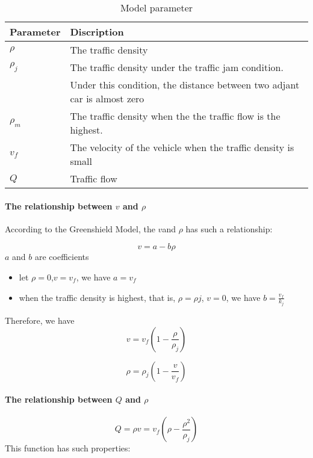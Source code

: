 \begin{table}
\centering
\begin{tabular}{ll}
\hline
Parameter & Discription\\
\hline
$\rho $ & The traffic density\\
$\rho_j$ & The traffic density under the traffic jam condition. \\
&Under this condition, the distance between two adjant car is almost zero\\
$\rho_m$ & The traffic density when the the traffic flow is the highest.\\
$v_f$ & The velocity of the vehicle when the traffic density is small \\
$Q$ & Traffic flow \\
\hline
\end{tabular}
\caption{Model parameter}
\end{table}


\paragraph{The relationship between $v$ and $\rho$ }
According to the Greenshield Model, the $v $and $\rho$ has such a 
relationship:

\begin{equation}
v = a - b\rho
\end{equation}
$a$ and $b$ are coefficients

\begin{itemize}
\item let $\rho = 0$,$v = v_f$,
we have $a = v_f$
\\
\item when the traffic density is highest, that is,
$\rho = \rho j$, $v = 0$,
we have $b = \frac{v_f}{k_j}$
\end{itemize}

Therefore, we have 
\begin{equation}
v = v_f(1 - \frac{\rho}{\rho_j})
\end{equation}

\begin{equation}
\rho = \rho_j(1 - \frac{v}{v_f})
\end {equation}

\paragraph{The relationship between $Q$ and $\rho$ }
\begin{equation}
Q = \rho v = v_f(\rho - \frac{\rho^2}{\rho_j})
\end{equation}
This function has such properties:


